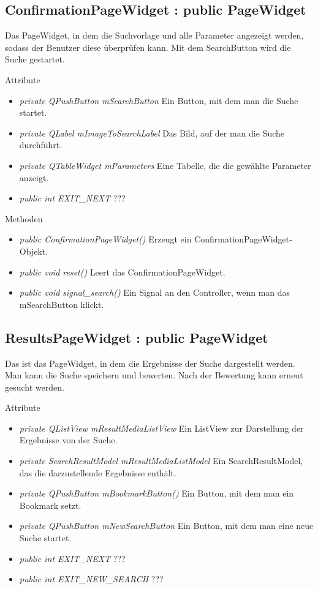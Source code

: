 \subsection*{ConfirmationPageWidget : public PageWidget}
Das PageWidget, in dem die Suchvorlage und alle Parameter angezeigt werden, sodass der Benutzer diese überprüfen kann. Mit dem SearchButton wird die Suche gestartet.

Attribute
\begin{itemize}
	\item\textit{private QPushButton mSearchButton}
	Ein Button, mit dem man die Suche startet.
	\item\textit{private QLabel mImageToSearchLabel}
	Das Bild, auf der man die Suche durchführt.
	\item\textit{private QTableWidget mParameters}
	Eine Tabelle, die die gewählte Parameter anzeigt.
	\item\textit{public int EXIT\_NEXT} 
	??? 
\end{itemize}

Methoden
\begin{itemize}
	\item\textit{public ConfirmationPageWidget()}
	Erzeugt ein ConfirmationPageWidget-Objekt.
	\item\textit{public void reset()}
	Leert das ConfirmationPageWidget. 
	\item\textit{public void signal\_search()}
	Ein Signal an den Controller, wenn man das mSearchButton klickt.
\end{itemize}

\subsection*{ResultsPageWidget : public PageWidget}
Das ist das PageWidget, in dem die Ergebnisse der Suche dargestellt werden. Man kann die Suche speichern und bewerten. Nach der Bewertung kann erneut gesucht werden.

Attribute
\begin{itemize}
	\item\textit{private QListView mResultMediaListView}
	Ein ListView zur Darstellung der Ergebnisse von der Suche.
	\item\textit{private SearchResultModel mResultMediaListModel}
	Ein SearchResultModel, das die darzustellende Ergebnisse enthält.
	\item\textit{private QPushButton mBookmarkButton()}
	Ein Button, mit dem man ein Bookmark setzt.
	\item\textit{private QPushButton mNewSearchButton}
	Ein Button, mit dem man eine neue Suche startet.
	\item\textit{public int EXIT\_NEXT}  
	???
	\item\textit{public int EXIT\_NEW\_SEARCH}
	???  
\end{itemize}

